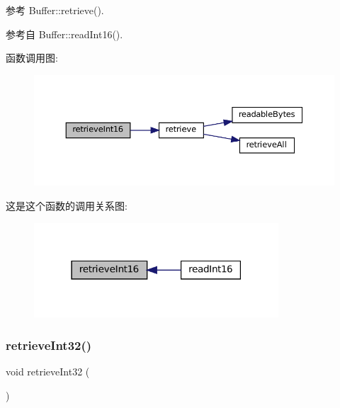 参考 Buffer\+::retrieve().



参考自 Buffer\+::read\+Int16().

函数调用图\+:
\nopagebreak
\begin{figure}[H]
\begin{center}
\leavevmode
\includegraphics[width=350pt]{classmuduo_1_1net_1_1Buffer_a78a272f407b370f1a5e0d30d0bdcf131_cgraph}
\end{center}
\end{figure}
这是这个函数的调用关系图\+:
\nopagebreak
\begin{figure}[H]
\begin{center}
\leavevmode
\includegraphics[width=259pt]{classmuduo_1_1net_1_1Buffer_a78a272f407b370f1a5e0d30d0bdcf131_icgraph}
\end{center}
\end{figure}
\mbox{\label{classmuduo_1_1net_1_1Buffer_a703d91e23ca1b8ab42350d8a9aa67de1}} 
\subsubsection{\texorpdfstring{retrieve\+Int32()}{retrieveInt32()}}
{\footnotesize\ttfamily void retrieve\+Int32 (\begin{DoxyParamCaption}{ }\end{DoxyParamCaption})\hspace{0.3cm}{\ttfamily [inline]}}



